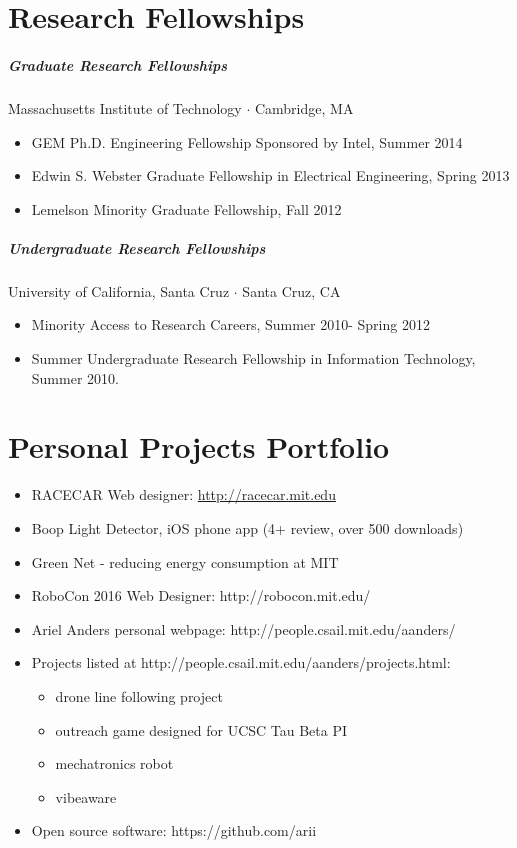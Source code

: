 \documentclass[10pt,letterpaper]{article}
\begin{document}
\section*{Research Fellowships}
\subparagraph{Graduate Research Fellowships}
Massachusetts Institute of Technology $\cdot$ Cambridge, MA 
\begin{itemize}
\item GEM Ph.D. Engineering Fellowship Sponsored by Intel, Summer 2014
\item  Edwin S. Webster Graduate Fellowship in Electrical Engineering, Spring 2013
\item Lemelson Minority Graduate Fellowship, Fall 2012
\end{itemize}
\subparagraph{Undergraduate Research Fellowships}
University of California, Santa Cruz $\cdot$ Santa Cruz, CA
\begin{itemize}
\item Minority Access to Research Careers, Summer 2010- Spring 2012
\item  Summer Undergraduate Research Fellowship in Information Technology, Summer 2010.  
\end{itemize}

\section*{Personal Projects Portfolio}
\begin{itemize}
\item RACECAR Web designer: \url{http://racecar.mit.edu}
\item Boop Light Detector, iOS phone app (4+ review, over 500 downloads)
\item Green Net - reducing energy consumption at MIT
\item RoboCon 2016 Web Designer: http://robocon.mit.edu/
\item Ariel Anders personal webpage: http://people.csail.mit.edu/aanders/
\item Projects listed at http://people.csail.mit.edu/aanders/projects.html:
\begin{itemize}
\item drone line following project
\item outreach game designed for UCSC Tau Beta PI
\item mechatronics robot
\item vibeaware
\end{itemize}
\item Open source software: https://github.com/arii
\end{itemize}
\end{document}
